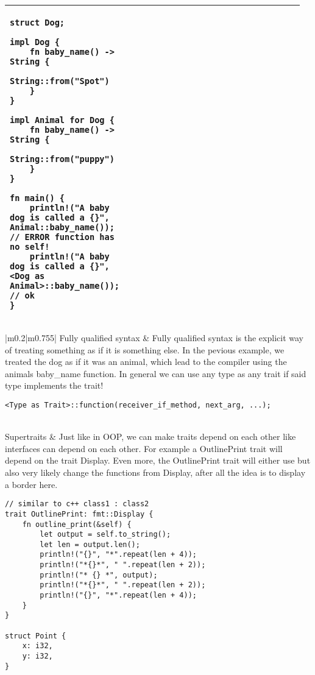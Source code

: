 \documentclass[main.tex,fontsize=8pt,paper=a4,paper=portrait,DIV=calc,]{scrartcl}
\begin{document}
\begin{table}[ht!]
\begin{tabular}{|m{0.2\linewidth}|m{0.755\linewidth}|}
\begin{lstlisting}
struct Dog;

impl Dog {
    fn baby_name() -> String {
        String::from("Spot")
    }
}

impl Animal for Dog {
    fn baby_name() -> String {
        String::from("puppy")
    }
}

fn main() {
    println!("A baby dog is called a {}", Animal::baby_name()); // ERROR function has no self!
    println!("A baby dog is called a {}", <Dog as Animal>::baby_name()); // ok
}
\end{lstlisting}\\
\hline
\end{tabular}
\end{table}
\pagebreak
\begin{table}[ht!]
\begin{tabular}{|m{0.2\linewidth}|m{0.755\linewidth}|}
\hline
Fully qualified syntax & 
Fully qualified syntax is the explicit way of treating something as if it is something else.\newline
In the pevious example, we treated the dog as if it was an animal, which lead to the compiler using the animals baby\_name function.
\textcolor{OliveGreen}{In general we can use any type as any trait if said type implements the trait!}\newline
\begin{lstlisting}
<Type as Trait>::function(receiver_if_method, next_arg, ...);
\end{lstlisting}\\
\hline
Supertraits & 
Just like in OOP, we can make traits depend on each other like interfaces can depend on each other.\newline
For example a OutlinePrint trait will depend on the trait Display.\newline
Even more, the OutlinePrint trait will either use but also very likely change the functions from Display, after all the idea is to display a border here.\newline
\begin{lstlisting}
// similar to c++ class1 : class2
trait OutlinePrint: fmt::Display {
    fn outline_print(&self) {
        let output = self.to_string();
        let len = output.len();
        println!("{}", "*".repeat(len + 4));
        println!("*{}*", " ".repeat(len + 2));
        println!("* {} *", output);
        println!("*{}*", " ".repeat(len + 2));
        println!("{}", "*".repeat(len + 4));
    }
}

struct Point {
    x: i32,
    y: i32,
}


\end{lstlisting}
\end{tabular}
\end{table}
\end{document}
